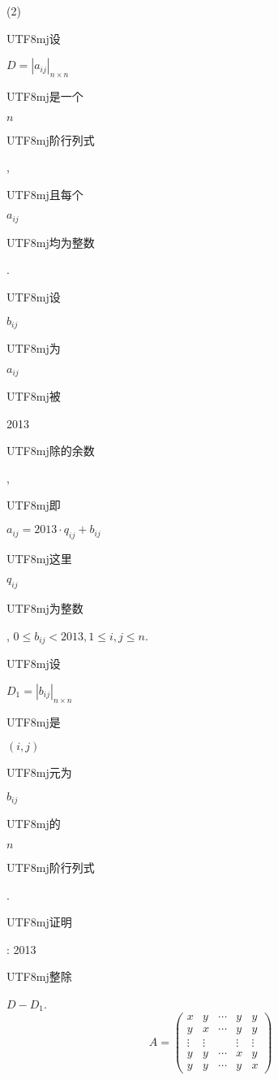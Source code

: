 \documentclass[10pt]{article}
\begin{document}
(2) \begin{CJK}{UTF8}{mj}设\end{CJK} $D=\left|a_{i j}\right|_{n \times n}$ \begin{CJK}{UTF8}{mj}是一个\end{CJK} $n$ \begin{CJK}{UTF8}{mj}阶行列式\end{CJK}, \begin{CJK}{UTF8}{mj}且每个\end{CJK} $a_{i j}$ \begin{CJK}{UTF8}{mj}均为整数\end{CJK}. \begin{CJK}{UTF8}{mj}设\end{CJK} $b_{i j}$ \begin{CJK}{UTF8}{mj}为\end{CJK} $a_{i j}$ \begin{CJK}{UTF8}{mj}被\end{CJK} 2013 \begin{CJK}{UTF8}{mj}除的余数\end{CJK}, \begin{CJK}{UTF8}{mj}即\end{CJK} $a_{i j}=2013 \cdot q_{i j}+b_{i j}$ \begin{CJK}{UTF8}{mj}这里\end{CJK} $q_{i j}$ \begin{CJK}{UTF8}{mj}为整数\end{CJK}, $0 \leqslant b_{i j}<2013,1 \leqslant i, j \leqslant n$. \begin{CJK}{UTF8}{mj}设\end{CJK} $D_{1}=\left|b_{i j}\right|_{n \times n}$ \begin{CJK}{UTF8}{mj}是\end{CJK} $(i, j)$ \begin{CJK}{UTF8}{mj}元为\end{CJK} $b_{i j}$ \begin{CJK}{UTF8}{mj}的\end{CJK} $n$ \begin{CJK}{UTF8}{mj}阶行列式\end{CJK}. \begin{CJK}{UTF8}{mj}证明\end{CJK}: 2013 \begin{CJK}{UTF8}{mj}整除\end{CJK} $D-D_{1}$.
$$
A=\left(\begin{array}{ccccc}
x & y & \cdots & y & y \\
y & x & \cdots & y & y \\
\vdots & \vdots & & \vdots & \vdots \\
y & y & \cdots & x & y \\
y & y & \cdots & y & x
\end{array}\right)
$$
\end{document}
